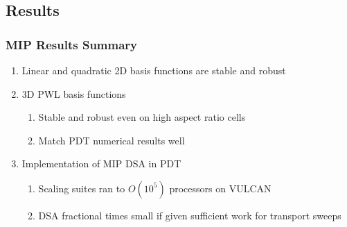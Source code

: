 \documentclass[compress,10pt]{beamer}
\begin{document}
\subsection{Results}
\begin{frame}[t]\frametitle{MIP Results Summary}
\begin{block}{}
\begin{enumerate}
\item Linear and quadratic 2D basis functions are stable and robust
\item 3D PWL basis functions
	\begin{enumerate}
	\item Stable and robust even on high aspect ratio cells
	\item Match PDT numerical results well
	\end{enumerate}
\item Implementation of MIP DSA in PDT
	\begin{enumerate}
	\item Scaling suites ran to $O(10^5)$ processors on VULCAN
	\item DSA fractional times small if given sufficient work for transport sweeps
	\end{enumerate}
\end{enumerate}
\end{block}
\end{frame}
\end{document}
